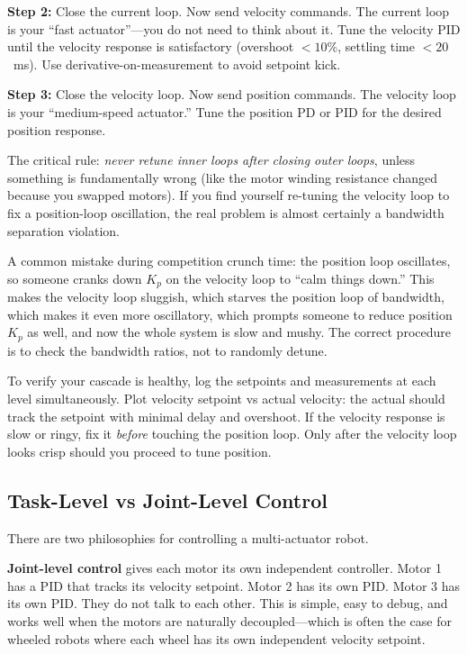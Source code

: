 \textbf{Step 2:} Close the current loop. Now send velocity commands. The current loop is your ``fast actuator''---you do not need to think about it. Tune the velocity PID until the velocity response is satisfactory (overshoot $<10\%$, settling time $<20$~ms). Use derivative-on-measurement to avoid setpoint kick.

\textbf{Step 3:} Close the velocity loop. Now send position commands. The velocity loop is your ``medium-speed actuator.'' Tune the position PD or PID for the desired position response.

The critical rule: \textit{never retune inner loops after closing outer loops}, unless something is fundamentally wrong (like the motor winding resistance changed because you swapped motors). If you find yourself re-tuning the velocity loop to fix a position-loop oscillation, the real problem is almost certainly a bandwidth separation violation.

A common mistake during competition crunch time: the position loop oscillates, so someone cranks down $K_p$ on the velocity loop to ``calm things down.'' This makes the velocity loop sluggish, which starves the position loop of bandwidth, which makes it even more oscillatory, which prompts someone to reduce position $K_p$ as well, and now the whole system is slow and mushy. The correct procedure is to check the bandwidth ratios, not to randomly detune.

To verify your cascade is healthy, log the setpoints and measurements at each level simultaneously. Plot velocity setpoint vs actual velocity: the actual should track the setpoint with minimal delay and overshoot. If the velocity response is slow or ringy, fix it \textit{before} touching the position loop. Only after the velocity loop looks crisp should you proceed to tune position.

\subsection{Task-Level vs Joint-Level Control}

There are two philosophies for controlling a multi-actuator robot.

\textbf{Joint-level control} gives each motor its own independent controller. Motor 1 has a PID that tracks its velocity setpoint. Motor 2 has its own PID. Motor 3 has its own PID. They do not talk to each other. This is simple, easy to debug, and works well when the motors are naturally decoupled---which is often the case for wheeled robots where each wheel has its own independent velocity setpoint.

